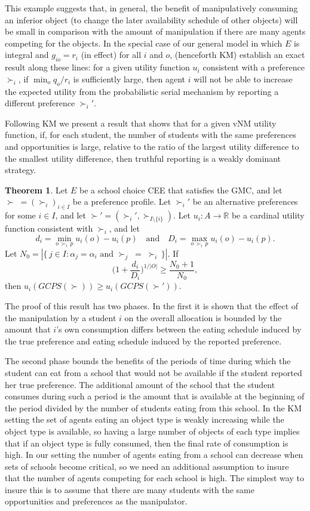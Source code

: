 \documentclass[12pt]{article}
\theoremstyle{definition}
\newtheorem{thm}{Theorem}
\renewcommand{\Re}{\mathbb{R}}
\begin{document}
This example suggests that, in general, the benefit of manipulatively consuming an inferior object (to change the later availability schedule of other objects) will be small in comparison with the amount of manipulation if there are many agents competing for the objects. In the special case of our general model in which $E$ is integral and $g_{io} = r_i$ (in effect) for all $i$ and $o$,  \cite{km10jet} (henceforth KM) establish an exact result along these lines: for a given utility function $u_i$ consistent with a preference $\succ_i$, if $\min_o q_o/r_i$ is sufficiently large, then agent $i$ will not be able to increase the expected utility from the probabilistic serial mechanism by reporting a different preference $\succ_i'$.

Following KM we present a result that shows that for a given vNM utility function, if, for each student, the number of students with the same preferences and opportunities is large, relative to the ratio of the largest utility difference to the smallest utility difference, then truthful reporting is a weakly dominant strategy.

\begin{thm} \label{th:StrategyProof}
Let $E$ be a school choice CEE that satisfies the GMC, and let $\succ \; = (\succ_i)_{i \in I}$ be a preference profile.  Let $\succ_i'$ be an alternative preferences for some $i \in I$,  and let $\succ' = (\succ_i',\succ_{I \setminus \{i\}})$.  Let $u_i \colon A \to \Re$ be a cardinal utility function consistent with $\succ_i$, and let $$d_i = \min_{o \, \succ_i \, p} u_i(o) - u_i(p) \quad \text{and} \quad D_i = \max_{o \, \succ_i \, p} u_i(o) - u_i(p).$$  Let
$N_0 =  |\{\, j \in I : \text{$\alpha_j = \alpha_i$ and $\succ_j \; = \; \succ_i$} \,\}|$.
If
$$\big(1 + \frac{d_i}{D_i}\big)^{1/|O|} \ge  \frac{N_0 + 1}{N_0},$$ then $u_i(GCPS(\succ)) \ge u_i(GCPS(\succ'))$.
\end{thm}

The proof of this result has two phases.  In the first it is shown that the effect of the manipulation by a student $i$ on the overall allocation is bounded by the amount that $i$'s own consumption differs between the eating schedule induced by the true preference and eating schedule induced by the reported preference.  

The second phase bounds the benefits of the periods of time during which the student can eat from a school that would not be available if the student reported her true preference.  The additional amount of the school that the student consumes during such a period is the amount that is available at the beginning of the period divided by the number of students eating from this school.  In the KM setting the set of agents eating an object type is weakly increasing while the object type is available, so having a large number of objects of each type implies that if an object type is fully consumed, then the final rate of consumption is high.  In our setting the number of agents eating from a school can decrease when sets of schools become critical, so we need an additional assumption to insure that the number of agents competing for each school is high.  The simplest way to insure this is to assume that there are many students with the same opportunities and preferences as the manipulator.
\end{document}
